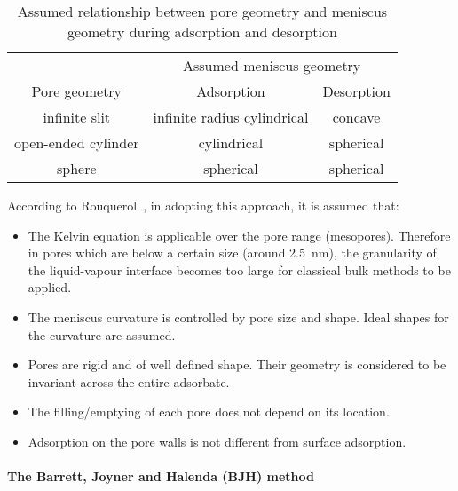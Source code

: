 \begin{table}[htb]
	\centering
	\caption{Assumed relationship between pore geometry and meniscus geometry during adsorption and desorption}%
	\label{pyg:tab:kelvin-meniscus}
	\begin{tabular}{ccc}
		\toprule
		                    & \multicolumn{2}{c}{Assumed meniscus geometry}              \\
		\cmidrule{2-3}
		Pore geometry       & Adsorption                                    & Desorption \\
		\midrule
		infinite slit       & infinite radius cylindrical                   & concave    \\
		open-ended cylinder & cylindrical                                   & spherical  \\
		sphere              & spherical                                     & spherical  \\
		\bottomrule
	\end{tabular}
\end{table}

According to Rouquerol~\cite{rouquerolAdsorptionPowdersPorous2013},
in adopting this approach, it is assumed that:

\begin{itemize}

	\item The Kelvin equation is applicable over the pore
	      range (mesopores). Therefore in pores which are below a
	      certain size (around \SI{2.5}{\nano\meter}), the granularity
	      of the liquid-vapour interface becomes too large for classical
	      bulk methods to be applied.
	\item The meniscus curvature is controlled by pore size and
	      shape. Ideal shapes for the curvature are assumed.
	\item Pores are rigid and of well defined shape. Their geometry is
	      considered to be invariant across the entire adsorbate.
	\item The filling/emptying of each pore does not depend on its location.
	\item Adsorption on the pore walls is not different from
	      surface adsorption.

\end{itemize}

\paragraph{The Barrett, Joyner and Halenda (BJH) method}

